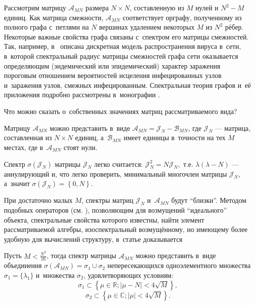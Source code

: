 Рассмотрим матрицу \( \mathscr{A}_{MN} \) размера \( N\times N \),
 составленную из \( M \) нулей и \( N^2 - M \) единиц.
Как матрица смежности, \( \mathscr{A}_{MN} \) соответствует орграфу,
 полученному из полного графа с~петлями на \( N \) вершинах
 удалением некоторых \( M \) из \( N^2 \) р\"ебер.
Некоторые важные свойства графа связаны с~спектром его матрицы смежностей.
Так, например, в~\cite{epidemic} описана дискретная модель
 распространения вируса в~сети, в~которой спектральный радиус матрицы смежностей графа сети
 оказывается определяющим (эндемический или эпидемический) характер заражения
 пороговым отношением вероятностей исцеления инфецированных узлов
 и~заражения узлов, смежных инфецированным.
Спектральная теория графов и~е\"е приложения подробно рассмотрены
в~монографии \cite{cvet}.

Что можно сказать о~собственных значениях матриц рассматриваемого вида?

Матрицу \( \mathscr{A}_{MN} \) можно представить в~виде
 \( \mathscr{A}_{MN} = \mathcal{J}_N - \mathscr{B}_{MN} \),
 где \( \mathcal{J}_N \) --- матрица, составленная из \( N\times N \) единиц,
 а~\( \mathscr{B}_{MN} \) имеет единицы в~точности на тех \( M \) местах,
 где в~\( \mathscr{A}_{MN} \) стоят нули.

Спектр \( \sigma\left( \mathcal{J}_N \right) \)
 матрицы \( \mathcal{J}_N \) легко считается:
 \( \mathcal{J}_N^2 = N \mathcal{J}_N, \) т.е.
 \( \lambda(\lambda - N) \) --- аннулирующий и, что легко проверить,
 минимальный многочлен матрицы \( \mathcal{J}_N \), а~значит
 \( \sigma\left( \mathcal{J}_N \right) = \left\{ 0,N \right\}. \)

При достаточно малых \( M \),
 спектры матриц \( \mathcal{J}_N \) и~\( \mathscr{A}_{MN} \) будут ``близки''.
Методом подобных операторов (см. \cite{baskakov-harmonic,baskakov-split}),
 позволяющим для возмущений ``идеального'' объекта, спектральные свойства которого известны,
 найти элемент рассматриваемой алгебры, изоспектральный возмущ\"енному,
 но имеющему более удобную для вычислений структуру,
 в~статье доказывается
\begin{thm}\label{kozlukovsv:thm:almost-all-ones}
    Пусть \( M < \frac{N^2}{16} \),
    тогда спектр матрицы \( \mathscr{A}_{MN} \) можно представить в~виде
    объединения \( \sigma\left(\mathscr{A}_{MN}\right) = \sigma_1 \cup \sigma_2 \)
    непересекающихся
    одноэлементного множества \( \sigma_1=\{\lambda_1\} \)
    и~множества \( \sigma_2 \), удовлетворяющих условиям:
    \[ \sigma_1 \subset \left\{ \mu\in\mathbb{R}; \lvert \mu - N \rvert < 4\sqrt{M} \right\}, \]
    \[ \sigma_2 \subset \left\{ \mu\in\mathbb{C}; \lvert \mu \rvert < 4\sqrt{M} \right\}. \]
\end{thm}
